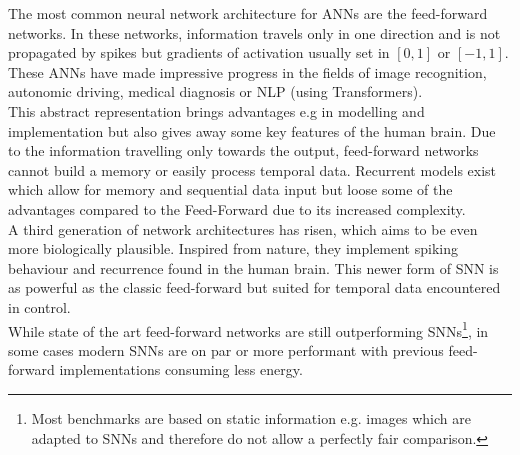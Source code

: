 The most common neural network architecture for \acp{ANN} are the feed-forward networks.
In these networks, information travels only in one direction and is not propagated by spikes but gradients of activation usually set in $[0,1]$ or $[-1,1]$.
These \acp{ANN} have made impressive progress in the fields of image recognition, autonomic driving, medical diagnosis\cite{patel_applications_2007} or  \ac{NLP} (using Transformers\cite{vaswani_attention_2017}).\\
This abstract representation brings advantages e.g in modelling and implementation but also gives away some key features of the human brain. Due to the information travelling only towards the output, feed-forward networks cannot build a memory or easily process temporal data. Recurrent models exist which allow for memory \cite{hutchison_biologically_2004} and sequential data input but loose some of the advantages compared to the Feed-Forward due to its increased complexity.\\
A third generation\cite{maass_networks_1997} of network architectures has risen, which aims to be even more biologically plausible. Inspired from nature, they implement spiking behaviour and recurrence found in the human brain.
This newer form of \ac{SNN} is as powerful as the classic feed-forward but suited for temporal data encountered in control.\\
While state of the art feed-forward networks are still outperforming \acp{SNN}\footnote{Most benchmarks are based on static information e.g. images which are adapted to \acp{SNN} and therefore do not allow a perfectly fair comparison.}, in some cases modern \acp{SNN} are on par\cite{lee_training_2016} or more performant with previous feed-forward implementations consuming less energy.

%

